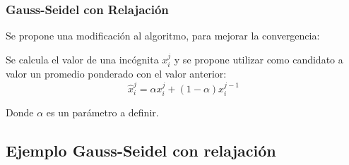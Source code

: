 \documentclass[xcolor=svgnames]{beamer} %
\theoremstyle{plain}
\theoremstyle{definition}
\begin{document}
\begin{frame}
\frametitle{Gauss-Seidel con Relajación}
Se propone una modificación al algoritmo, para mejorar la convergencia:\vspace{15pt}


\pause
Se calcula el valor de una incógnita $x_i^j$ y se propone utilizar como candidato a valor un promedio ponderado con el valor anterior:
$$ \hat x_i^j = \alpha x_i^{j} + (1-\alpha) x_i^{j-1} $$

Donde $\alpha$ es un parámetro a definir.

\end{frame}

\subsection{Ejemplo Gauss-Seidel con relajación}
\end{document}
